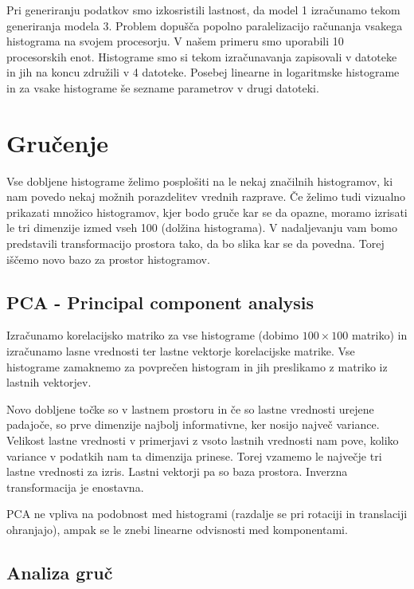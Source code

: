 \documentclass[a4paper]{IEEEtran}
\begin{document}
Pri generiranju podatkov smo izkosristili lastnost, da model 1 izračunamo tekom generiranja modela 3. Problem dopušča popolno paralelizacijo računanja vsakega histograma na svojem procesorju. V našem primeru smo uporabili 10 procesorskih enot. Histograme smo si tekom izračunavanja zapisovali v datoteke in jih na koncu združili v 4 datoteke. Posebej linearne in logaritmske histograme in za vsake histograme še sezname parametrov v drugi datoteki.

\section{Gručenje}

Vse dobljene histograme želimo posplošiti na le nekaj značilnih histogramov, ki nam povedo nekaj možnih porazdelitev vrednih razprave. Če želimo tudi vizualno prikazati množico histogramov, kjer bodo gruče kar se da opazne, moramo izrisati le tri dimenzije izmed vseh 100 (dolžina histograma). V nadaljevanju vam bomo predstavili transformacijo prostora tako, da bo slika kar se da povedna. Torej iščemo novo bazo za prostor histogramov.

\subsection{PCA - Principal component analysis}

Izračunamo korelacijsko matriko za vse histograme (dobimo $100\times100$ matriko) in izračunamo lasne vrednosti ter lastne vektorje korelacijske matrike. Vse histograme zamaknemo za povprečen histogram in jih preslikamo z matriko iz lastnih vektorjev.

Novo dobljene točke so v lastnem prostoru in če so lastne vrednosti urejene padajoče, so prve dimenzije najbolj informativne, ker nosijo največ variance. Velikost lastne vrednosti v primerjavi z vsoto lastnih vrednosti nam pove, koliko variance v podatkih nam ta dimenzija prinese. Torej vzamemo le največje tri lastne vrednosti za izris. Lastni vektorji pa so baza prostora. Inverzna transformacija je enostavna.

PCA ne vpliva na podobnost med histogrami (razdalje se pri rotaciji in translaciji ohranjajo), ampak se le znebi linearne odvisnosti med komponentami.

\subsection{Analiza gruč}
\end{document}
